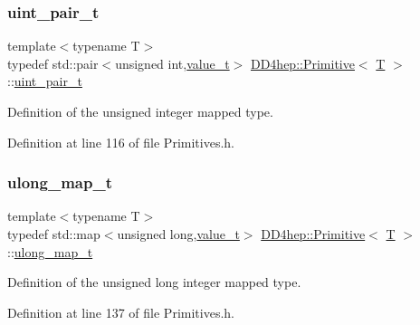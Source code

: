 \subsubsection{\texorpdfstring{uint\+\_\+pair\+\_\+t}{uint\_pair\_t}}
{\footnotesize\ttfamily template$<$typename T$>$ \\
typedef std\+::pair$<$unsigned int,\hyperlink{struct_d_d4hep_1_1_primitive_a0639e73bb8f07f99c2d8401f807a7af6}{value\+\_\+t}$>$ \hyperlink{struct_d_d4hep_1_1_primitive}{D\+D4hep\+::\+Primitive}$<$ \hyperlink{class_t}{T} $>$\+::\hyperlink{struct_d_d4hep_1_1_primitive_a1f46f9637b5b90c407a5725db6d09142}{uint\+\_\+pair\+\_\+t}}



Definition of the unsigned integer mapped type. 



Definition at line 116 of file Primitives.\+h.

\hypertarget{struct_d_d4hep_1_1_primitive_ab4ba00823c6afd9907a1d53af783d2fe}{}\label{struct_d_d4hep_1_1_primitive_ab4ba00823c6afd9907a1d53af783d2fe} 
\subsubsection{\texorpdfstring{ulong\+\_\+map\+\_\+t}{ulong\_map\_t}}
{\footnotesize\ttfamily template$<$typename T$>$ \\
typedef std\+::map$<$unsigned long,\hyperlink{struct_d_d4hep_1_1_primitive_a0639e73bb8f07f99c2d8401f807a7af6}{value\+\_\+t}$>$ \hyperlink{struct_d_d4hep_1_1_primitive}{D\+D4hep\+::\+Primitive}$<$ \hyperlink{class_t}{T} $>$\+::\hyperlink{struct_d_d4hep_1_1_primitive_ab4ba00823c6afd9907a1d53af783d2fe}{ulong\+\_\+map\+\_\+t}}



Definition of the unsigned long integer mapped type. 



Definition at line 137 of file Primitives.\+h.

\hypertarget{struct_d_d4hep_1_1_primitive_a776a90beccb1b044c258b851c8128509}{}\label{struct_d_d4hep_1_1_primitive_a776a90beccb1b044c258b851c8128509} 
